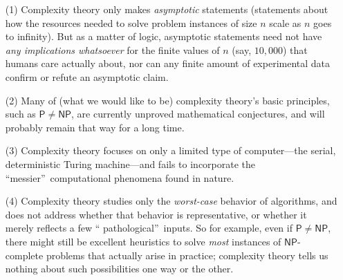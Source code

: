 \documentclass[12pt,onecolumn]{article}%
\begin{document}
\begin{enumerate}
\item[(1)] Complexity theory only makes \textit{asymptotic} statements
(statements about how the resources needed to solve problem instances of size
$n$ scale as $n$ goes to infinity). But as a matter of logic, asymptotic
statements need not have \textit{any implications whatsoever} for the finite
values of $n$ (say, $10,000$) that humans care actually about, nor can any
finite amount of experimental data confirm or refute an asymptotic claim.

\item[(2)] Many of (what we would like to be) complexity theory's basic
principles, such as $\mathsf{P}\neq\mathsf{NP}$, are currently unproved
mathematical conjectures, and will probably remain that way for a long time.

\item[(3)] Complexity theory focuses on only a limited type of computer---the
serial, deterministic Turing machine---and fails to incorporate the
\textquotedblleft messier\textquotedblright\  computational phenomena found in nature.

\item[(4)] Complexity theory studies only the \textit{worst-case} behavior of
algorithms, and does not address whether that behavior is representative, or
whether it merely reflects a few \textquotedblleft
pathological\textquotedblright\  inputs. So for example, even if $\mathsf{P}%
\neq\mathsf{NP}$, there might still be excellent heuristics to solve
\textit{most} instances of $\mathsf{NP}$-complete problems that actually arise
in practice; complexity theory tells us nothing about such possibilities one
way or the other.
\end{enumerate}
\end{document}
